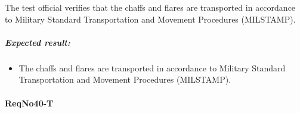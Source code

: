 The test official verifies that the chaffs and flares are transported in accordance to Military Standard Transportation and Movement Procedures (MILSTAMP).

\subparagraph{Expected result:}
	\begin{itemize}
	\item The chaffs and flares are transported in accordance to Military Standard Transportation and Movement Procedures (MILSTAMP).
	\end{itemize}

\paragraph{ReqNo40-T}\mbox{}\\ %